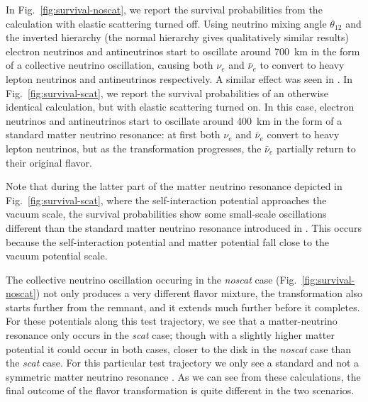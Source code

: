 \documentclass[aps,floatfix,prd,superscriptaddress,twocolumn]{revtex4-1}
\begin{document}
In Fig.~\ref{fig:survival-noscat}, we report the survival probabilities
from the calculation with elastic scattering turned off.
Using neutrino mixing angle $\theta_{12}$ and the inverted hierarchy
(the normal hierarchy gives qualitatively similar results)
electron neutrinos and antineutrinos start to oscillate around
700~km in the form of a collective neutrino oscillation,
causing both $\nu_e$ and $\bar{\nu}_e$ to convert to heavy lepton neutrinos
and antineutrinos respectively.
A similar effect was seen in \cite{fren2017-flavor_bns,tian2017-flavor_bns}.
In Fig.~\ref{fig:survival-scat}, we report the survival probabilities
of an otherwise identical calculation, but with elastic scattering turned on.
In this case, electron neutrinos and antineutrinos start to oscillate around
400~km in the form of a standard matter neutrino resonance:
at first both $\nu_e$ and $\bar{\nu}_e$ convert to heavy lepton neutrinos,
but as the transformation progresses, the $\bar{\nu}_e$ partially
return to their original flavor.

Note that during the latter part of the matter neutrino resonance
depicted in Fig.~\ref{fig:survival-scat},
where the self-interaction potential approaches the vacuum scale,
the survival probabilities show some small-scale oscillations
different than the standard matter neutrino resonance
introduced in \cite{malk2015-mnr_2}.
This occurs because the self-interaction potential and matter potential
fall close to the vacuum potential scale.

The collective neutrino oscillation occuring in the \emph{noscat} case
(Fig.~\ref{fig:survival-noscat})
not only produces a very different flavor mixture,
the transformation also starts further from the remnant,
and it extends much further before it completes.
For these potentials along this test trajectory,
we see that a matter-neutrino resonance only occurs in the \emph{scat} case;
though with a slightly higher matter potential it could occur in both cases,
closer to the disk in the \emph{noscat} case than the \emph{scat} case.
For this particular test trajectory we only see a standard and not a symmetric
matter neutrino resonance \cite{malk2016-mnr_3,vaan2016-uncovering_mnr}.
As we can see from these calculations, the final outcome of the flavor
transformation is quite different in the two scenarios.
\end{document}
